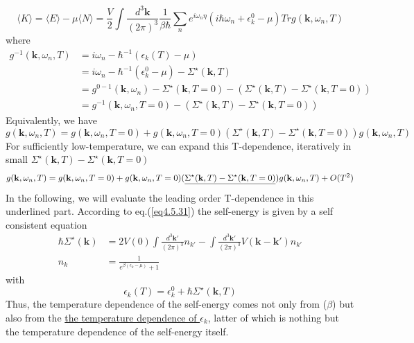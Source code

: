\begin{equation}\tag{4.6.10}
\langle K \rangle=\langle E \rangle-\mu\langle N \rangle=\frac{V}{2} \int \frac{d^3 \mathbf{k}}{(2\pi)^3} \frac{1}{\beta\hbar} \sum_n e^{i\omega_n \eta}\left(i\hbar\omega_n+\epsilon_k^0-\mu\right)Tr g(\mathbf{k},\omega_n,T)
\end{equation}
where
\[
\begin{aligned}
g^{-1}(\mathbf{k},\omega_n,T)&=i\omega_n -\hbar^{-1} (\epsilon_k(T)-\mu)\\
&=i\omega_n -\hbar^{-1} (\epsilon_k^0-\mu) - \Sigma^\star(\mathbf{k},T)\\
&=g^{0-1}(\mathbf{k},\omega_n)-\Sigma^\star(\mathbf{k},T=0)-(\Sigma^\star(\mathbf{k},T)- \Sigma^\star(\mathbf{k},T=0))\\
&=g^{-1}(\mathbf{k},\omega_n,T=0)-(\Sigma^\star(\mathbf{k},T)-\Sigma^\star(\mathbf{k},T=0))
\end{aligned}
\]
Equivalently, we have
\begin{equation}
g(\mathbf{k},\omega_n,T)=g(\mathbf{k},\omega_n,T=0)+g(\mathbf{k},\omega_n,T=0) (\Sigma^\star(\mathbf{k},T)-\Sigma^\star(\mathbf{k},T=0)) g(\mathbf{k},\omega_n,T)
\end{equation}
For sufficiently low-temperature, we can expand this T-dependence, iteratively in small $\Sigma^\star(\mathbf{k},T)-\Sigma^\star(\mathbf{k},T=0)$
\begin{equation}\label{eq4.6.15}
g(\mathbf{k},\omega_n,T)=g(\mathbf{k},\omega_n,T=0)+g(\mathbf{k},\omega_n,T=0) (\uline{\Sigma^\star(\mathbf{k},T)-\Sigma^\star(\mathbf{k},T=0)}) g(\mathbf{k},\omega_n,T)+O(T^2)
\end{equation}
In the following, we will evaluate the leading order T-dependence in this underlined part.
According to eq.(\ref{eq4.5.31}) the self-energy is given by a self consistent equation
\begin{equation}\label{eq4.6.16}
\begin{aligned}
\hbar \Sigma^\star(\mathbf{k})&=2V(0)\int\frac{d^3\mathbf{k}'}{(2\pi)^3}n_{k'}-\int\frac{d^3\mathbf{k}'}{(2\pi)^3}V(\mathbf{k}-\mathbf{k}')n_{k'}\\
n_k&=\frac{1}{e^{\beta(\epsilon_k-\mu)}+1}
\end{aligned}
\end{equation}
with
\begin{equation}
\epsilon_k(T)=\epsilon_k^0+\hbar \Sigma^\star (\mathbf{k},T)
\end{equation}
Thus, the temperature dependence of the self-energy comes not only from ($\beta$) but also from the \uline{the temperature dependence of $\epsilon_k$}, latter of which is nothing but the temperature dependence of the self-energy itself.
